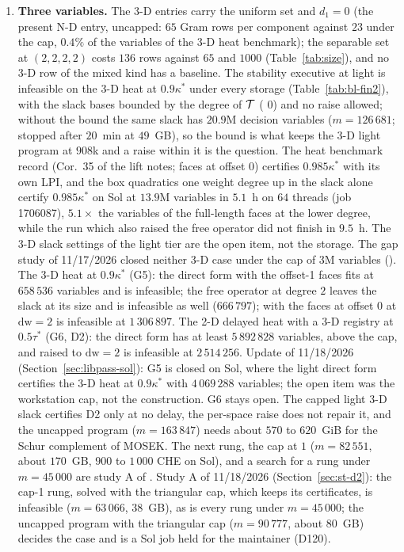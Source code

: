 \begin{enumerate}
\item \textbf{Three variables.} The 3-D entries carry the uniform set and $d_1=0$ (the present N-D entry, uncapped: $65$ Gram rows per component against $23$ under the  cap, $0.4\%$ of the variables of the 3-D heat benchmark); the separable set at $(2,2,2,2)$ costs $136$ rows against $65$ and  $1000$ (Table~\ref{tab:size}), and no 3-D row of the mixed kind has a baseline. The stability executive at light is infeasible on the 3-D heat at $0.9\kappa^*$ under every storage (Table~\ref{tab:bl-fin2}), with the slack bases bounded by the degree of $\mathcal{T}$ ( $0$) and no raise allowed; without the bound the same slack has $20.9$M decision variables ($m=126\,681$; stopped after $20$~min at $49$~GB), so the bound is what keeps the 3-D light program at $908$k and a raise within it is the question. The heat benchmark record (Cor.~35 of the lift notes; faces at offset $0$) certifies $0.985\kappa^*$ with its own LPI, and the box quadratics one weight degree up in the slack alone certify $0.985\kappa^*$ on Sol at $13.9$M variables in $5.1$~h on $64$ threads (job 1706087), $5.1\times$ the variables of the full-length faces at the lower degree, while the run which also raised the free operator did not finish in $9.5$~h. The 3-D slack settings of the light tier are the open item, not the storage. The gap study of 11/17/2026 closed neither 3-D case under the cap of $3$M variables (\gapsref). The 3-D heat at $0.9\kappa^*$ (G5): the direct form with the offset-1 faces fits at $658\,536$ variables and is infeasible; the free operator at degree $2$ leaves the slack at its size and is infeasible as well ($666\,797$);  with the faces at offset $0$ at $\mathrm{dw}=2$ is infeasible at $1\,306\,897$. The 2-D delayed heat with a 3-D registry at $0.5\tau^*$ (G6, D2): the direct form has at least $5\,892\,828$ variables, above the cap, and  raised to $\mathrm{dw}=2$ is infeasible at $2\,514\,256$. Update of 11/18/2026 (Section~\ref{sec:libpass-sol}): G5 is closed on Sol, where the light direct form certifies the 3-D heat at $0.9\kappa^*$ with $4\,069\,288$ variables; the open item was the workstation cap, not the construction. G6 stays open. The capped light 3-D slack certifies D2 only at no delay, the per-space raise does not repair it, and the uncapped program ($m=163\,847$) needs about $570$ to $620$~GiB for the Schur complement of MOSEK. The next rung, the cap at $1$ ($m=82\,551$, about $170$~GB, $900$ to $1\,000$ CHE on Sol), and a search for a rung under $m=45\,000$ are study A of . Study A of 11/18/2026 (Section~\ref{sec:st-d2}): the cap-1 rung, solved with the triangular cap, which keeps its certificates, is infeasible ($m=63\,066$, $38$~GB), as is every rung under $m=45\,000$; the uncapped program with the triangular cap ($m=90\,777$, about $80$~GB) decides the case and is a Sol job held for the maintainer (D120).

\end{enumerate}
